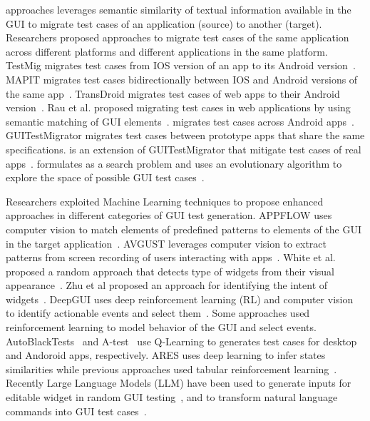 \smallskip 
\testreuse approaches leverages semantic similarity of textual information available in the GUI to migrate test cases of an application (source) to another (target).
Researchers proposed approaches to migrate test cases of the same  application across different platforms and different applications in the same platform. 
TestMig migrates test cases from IOS version of an app to its Android version~\cite{Qin:testmig:ISSTA:2019}.
MAPIT migrates test cases bidirectionally between IOS and Android versions of the same app~\cite{talebipour:MAPIT:ASE:2021}.
TransDroid migrates test cases of web apps to their Android version~\cite{lin:TransDroid:ICST:2022}.
 Rau et al. proposed migrating test cases in web applications by using semantic matching of GUI elements~\cite{rau:efficent:icse:2018}.
 \craftdroid migrates test cases across Android apps~\cite{lin:craftdroid:ASE:2019}.
GUITestMigrator migrates test cases between prototype apps that share the same specifications.
\atm is an extension of GUITestMigrator that mitigate test cases of real apps~\cite{Behrang:migration:ICSE:2018}.
 \adaptdroid formulates \testreuse as a search problem and uses an evolutionary algorithm to explore the space of possible GUI test cases~\cite{Mariani:Adaptdroid:AST:2021}.
 
 
\smallskip 
Researchers exploited Machine Learning techniques to propose enhanced approaches in different categories of GUI test generation.
APPFLOW uses computer vision to match elements of predefined patterns to elements of the GUI in the target application~\cite{Hu:appflow:FSE:2018}.
AVGUST leverages computer vision to extract patterns from screen recording of users interacting with apps~\cite{zhao:Avgust:FSE:2022}.
White et al. proposed a random approach that detects type of widgets from their visual appearance~\cite{white:WidgetDetection:ISSTA:2019}.
Zhu et al proposed an approach for identifying the intent of widgets~\cite{zhu2021widgetrecog}.
DeepGUI uses deep reinforcement learning (RL) and computer vision to identify actionable events and select them~\cite{YazdaniBanafsheDaragh:DEEPGUI:ASE:2021}.
Some approaches used reinforcement learning  to model behavior of the GUI and select events. 
AutoBlackTests~\cite{Mariani:ABT:STVR:2014} and A-test~\cite{Vuong:RLTest:A-Test:2018} use Q-Learning to generates test cases  for desktop and Andoroid apps, respectively.
ARES uses deep learning to infer states similarities while previous approaches used tabular reinforcement learning~\cite{Romdhana:ARES:TOSEM:2022}.
Recently Large Language Models (LLM) have been used to generate inputs for editable widget in random GUI testing~\cite{liu:GUIInputLLM:ICSE:2023}, and to transform natural language commands into GUI test cases~\cite{Zimmermann:GPT3GUITest:2023:ICSTW}. 

